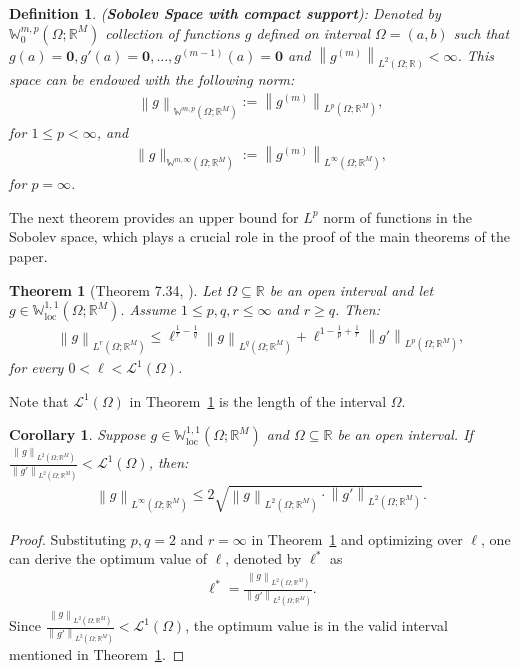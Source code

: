 \documentclass{article}
\newtheorem{definition}{Definition}
\newtheorem{theorem}{Theorem}
\newtheorem{corollary}{Corollary}
\newcommand{\norm}[1]{\left\lVert#1\right\rVert}
\newcommand{\lp}[1]{{L}^{#1}\left(\Omega; \mathbb{R}\right)}
\newcommand{\lpm}[1]{{L}^{#1}\left(\Omega; \mathbb{R}^M\right)}
\newcommand{\smp}{\mathbb{W}^{m,p}\left(\Omega; \mathbb{R}^M\right)}
\newcommand{\smpz}{\mathbb{W}_0^{m,p}\left(\Omega; \mathbb{R}^M\right)}
\newcommand{\soblocm}[2]{\mathbb{W}_{\textrm{loc}}^{#1,#2}\left(\Omega; \mathbb{R}^M\right)}
\newcommand{\sobm}[2]{\mathbb{W}^{#1,#2}\left(\Omega; \mathbb{R}^M\right)}
\begin{document}
\begin{definition}\label{def:sobz}(\textbf{Sobolev Space with compact support}): Denoted by $\smpz$ collection of functions $g$ defined on interval $\Omega=(a, b)$ such that $g(a)=\mathbf{0}, g'(a) = \mathbf{0}, \dots, g^{(m-1)}(a)=\mathbf{0}$ and $\norm{g^{(m)}}_{\lp{2}} < \infty$. This space can be endowed with the following norm:
\begin{align}
    \norm{g}_{\smp} :=  \norm{g^{(m)}}_{\lpm{p}},
\end{align}
for $1 \leqslant p < \infty$, and
\begin{align}\label{eq:sob_norm2_2}
    \|g\|_{\sobm{m}{\infty}} :=  \norm{g^{(m)}}_{\lpm{\infty}},
\end{align}
for $p=\infty$.
\end{definition}


The next theorem provides an upper bound for ${L}^p$ norm of functions in the Sobolev space, which plays a crucial role in the proof of the main theorems of the paper.
\begin{theorem}[Theorem 7.34, \citep{leoni2024first}] \label{th:interp_ineq} Let $\Omega \subseteq \mathbb{R}$ be an open interval and let $g \in \soblocm{1}{1}$. Assume $1 \leqslant p,q,r \leqslant \infty$ and $r \geqslant q$. Then:
    \begin{align}
        \norm{g}_{\lpm{r}} \leqslant \ell^{\frac{1}{r}-\frac{1}{q}}\norm{g}_{\lpm{q}} + \ell^{1 - \frac{1}{p}+\frac{1}{r}}\norm{g'}_{\lpm{p}},
    \end{align}
    for every $0 < \ell < \mathcal{L}^1(\Omega)$.
\end{theorem}
Note that $\mathcal{L}^1(\Omega)$ in Theorem~\ref{th:interp_ineq} is the length of the interval $\Omega$. 
\begin{corollary}\label{col:interp_ineq}
    Suppose $g \in \soblocm{1}{1}$ and $\Omega \subseteq \mathbb{R}$ be an open interval. If $\frac{\norm{g}_{\lpm{2}}}{\norm{g'}_{\lpm{2}}} < \mathcal{L}^1(\Omega)$, then:
    \begin{align}
        \norm{g}_{\lpm{\infty}} \leqslant 2\sqrt{\norm{g}_{\lpm{2}}\cdot\norm{g'}_{\lpm{2}}}.
    \end{align}
\end{corollary}
\begin{proof}
    Substituting $p,q=2$ and $r=\infty$ in Theorem~\ref{th:interp_ineq} and optimizing over $\ell$, one can derive the optimum value of $\ell$, denoted by $\ell^*$ as
    \begin{align}
    \ell^* = \frac{\norm{g}_{\lpm{2}}}{\norm{g'}_{\lpm{2}}}.
    \end{align}
    Since $\frac{\norm{g}_{\lpm{2}}}{\norm{g'}_{\lpm{2}}} < \mathcal{L}^1(\Omega)$,  the optimum value is in the valid interval mentioned in Theorem~\ref{th:interp_ineq}.
\end{proof}
\end{document}
